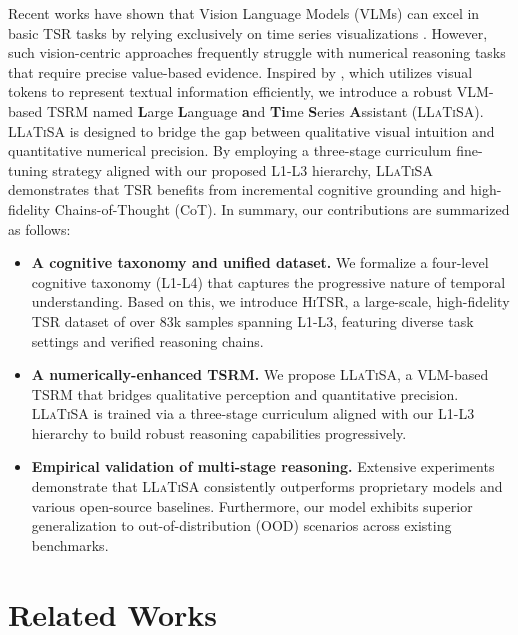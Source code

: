 \documentclass[11pt]{article}
\begin{document}
Recent works have shown that Vision Language Models (VLMs) can excel in basic TSR tasks by relying exclusively on time series visualizations \cite{timemaster,bedtime}. However, such vision-centric approaches frequently struggle with numerical reasoning tasks that require precise value-based evidence. Inspired by \cite{deepseekocr}, which utilizes visual tokens to represent textual information efficiently, we introduce a robust VLM-based TSRM named \textbf{L}arge \textbf{L}anguage \textbf{a}nd \textbf{Ti}me \textbf{S}eries \textbf{A}ssistant (\textsc{LLaTiSA}). \textsc{LLaTiSA} is designed to bridge the gap between qualitative visual intuition and quantitative numerical precision. By employing a three-stage curriculum fine-tuning strategy aligned with our proposed L1-L3 hierarchy, \textsc{LLaTiSA} demonstrates that TSR benefits from incremental cognitive grounding and high-fidelity Chains-of-Thought (CoT). In summary, our contributions are summarized as follows:
\begin{itemize}[left=0pt]
\setlength{\itemsep}{0.5pt}
    \item \textbf{A cognitive taxonomy and unified dataset.} We formalize a four-level cognitive taxonomy (L1-L4) that captures the progressive nature of temporal understanding. Based on this, we introduce \textsc{HiTSR}, a large-scale, high-fidelity TSR dataset of over 83k samples spanning L1-L3, featuring diverse task settings and verified reasoning chains.
    \item \textbf{A numerically-enhanced TSRM.} We propose \textsc{LLaTiSA}, a VLM-based TSRM that bridges qualitative perception and quantitative precision. \textsc{LLaTiSA} is trained via a three-stage curriculum aligned with our L1-L3 hierarchy to build robust reasoning capabilities progressively.
    \item \textbf{Empirical validation of multi-stage reasoning.} Extensive experiments demonstrate that \textsc{LLaTiSA} consistently outperforms proprietary models and various open-source baselines. Furthermore, our model exhibits superior generalization to out-of-distribution (OOD) scenarios across existing benchmarks.
\end{itemize}

\section{Related Works}
\end{document}
